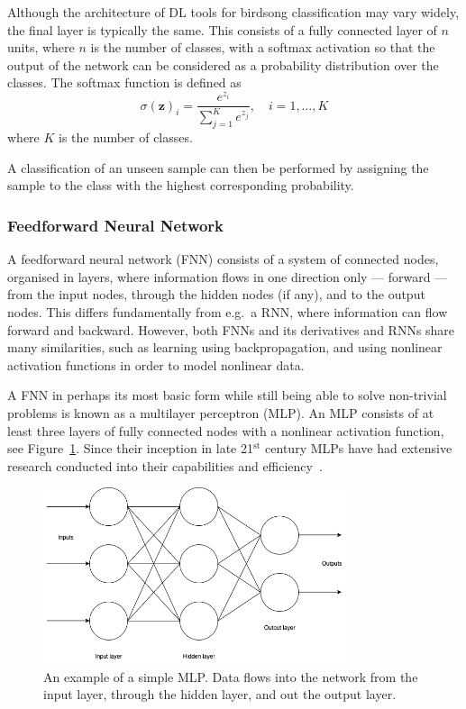 Although the architecture of DL tools for birdsong classification may vary
widely, the final layer is typically the same. This consists of a fully
connected layer of $n$ units, where $n$ is the number of classes, with a softmax
activation so that the output of the network can be considered as a probability
distribution over the classes. The softmax function is defined as
\begin{equation}
\sigma{(\mathbf{z})}_i = \frac{e^{z_i}}
  {\sum_{j=1}^{K} e^{z_j}}, \hspace{1em} i = 1,\ldots,K
\end{equation}
where $K$ is the number of classes.

A classification of an unseen sample can then be performed by assigning the
sample to the class with the highest corresponding probability.

\subsubsection{Feedforward Neural Network}

A feedforward neural network (FNN) consists of a system of connected nodes,
organised in layers, where information flows in one direction only --- forward
--- from the input nodes, through the hidden nodes (if any), and to the output
nodes. This differs fundamentally from e.g.\ a RNN, where information can flow
forward and backward. However, both FNNs and its derivatives and RNNs share
many similarities, such as learning using backpropagation, and using nonlinear
activation functions in order to model nonlinear data.

A FNN in perhaps its most basic form while still being able to solve non-trivial
problems is known as a multilayer perceptron (MLP). An MLP consists of at least
three layers of fully connected nodes with a nonlinear activation function, see
Figure~\ref{fig:mlp}. Since their inception in late 21$^{\text{st}}$ century
MLPs have had extensive research conducted into their capabilities and
efficiency~\cite{hornik1989multilayer}.

\begin{figure}[ht]
  \centering
  \includegraphics[width=0.8\textwidth]{figures/mlp.png}
  \caption{An example of a simple MLP\@. Data flows into the network from the
  input layer, through the hidden layer, and out the output layer.}\label{fig:mlp}
\end{figure}


